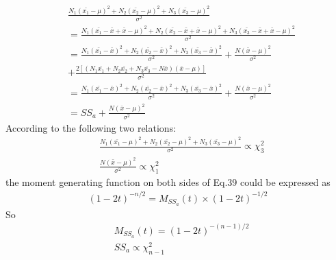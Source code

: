 \documentclass{article}
\begin{document}
\begin{equation} 
\begin{aligned}
&\frac{N_{1}(\bar{x_{1}}-\mu)^{2}+N_{2}(\bar{x_{2}}-\mu)^{2}+N_{3}(\bar{x_{3}}-\mu)^{2}}{\sigma^{2}}\\
    &=\frac{N_{1}(\bar{x_{1}}-\bar{x}+\bar{x}-\mu)^{2}+N_{2}(\bar{x_{2}}-\bar{x}+\bar{x}-\mu)^{2}+N_{3}(\bar{x_{3}}-\bar{x}+\bar{x}-\mu)^{2}}{\sigma^{2}}\\
    &=\frac{N_{1}(\bar{x_{1}}-\bar{x})^{2}+N_{2}(\bar{x_{2}}-\bar{x})^{2}+N_{3}(\bar{x_{3}}-\bar{x})^{2}}{\sigma^{2}}+\frac{N(\bar{x}-\mu)^{2}}{\sigma^{2}}\\
    &+\frac{2\left[(N_{1}\bar{x_{1}}+N_{2}\bar{x_{2}}+N_{3}\bar{x_{3}}-N\bar{x})(\bar{x}-\mu)\right]}{\sigma^{2}}\\
    &=\frac{N_{1}(\bar{x_{1}}-\bar{x})^{2}+N_{2}(\bar{x_{2}}-\bar{x})^{2}+N_{3}(\bar{x_{3}}-\bar{x})^{2}}{\sigma^{2}}+\frac{N(\bar{x}-\mu)^{2}}{\sigma^{2}}\\
    &=SS_{a}+\frac{N(\bar{x}-\mu)^{2}}{\sigma^{2}} \label{39}
\end{aligned}
\end{equation}
According to the following two relations:
\begin{equation}
    \begin{aligned}
    &\frac{N_{1}(\bar{x_{1}}-\mu)^{2}+N_{2}(\bar{x_{2}}-\mu)^{2}+N_{3}(\bar{x_{3}}-\mu)^{2}}{\sigma^{2}}\propto \chi_{3}^{2}\\
    &\frac{N(\bar{x}-\mu)^{2}}{\sigma^{2}}\propto \chi_{1}^{2}
    \end{aligned}
\end{equation}
the moment generating function on both sides of Eq.39 could be expressed as
\begin{equation}
\begin{split}
(1-2t)^{-n/2}=M_{SS_{a}}(t)\times(1-2t)^{-1/2}
\end{split}
\end{equation}
So
\begin{equation}
\begin{aligned}
&M_{SS_{a}}(t)=(1-2t)^{-(n-1)/2}\\
&SS_{a}\propto \chi_{n-1}^{2}
\end{aligned}
\end{equation}
\end{document}

